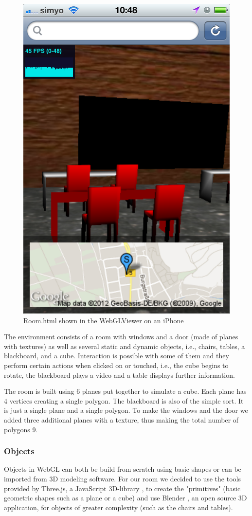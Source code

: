 \documentclass[12pt,journal,compsoc]{IEEEtran}
\begin{document}
\begin{figure}[htb]
	\centerline{\includegraphics[width=0.6\columnwidth]{grafiken/room_Mobile}}
	\caption{Room.html shown in the WebGLViewer on an iPhone}
	\label{fig:roomMobile}
\end{figure}

The environment consists of a room with windows and a door (made of planes with textures) as well as several static and dynamic objects, i.e., chairs, tables, a blackboard, and a cube. Interaction is possible with some of them and they perform certain actions when clicked on or touched, i.e., the cube begins to rotate, the blackboard plays a video and a table displays further information.

The room is built using 6 planes put together to simulate a cube. Each plane has 4 vertices creating a single polygon. The blackboard is also of the simple sort. It is just a single plane and a single polygon. To make the windows and the door we added three additional planes with a texture, thus making the total number of polygons 9.

\subsubsection{Objects}
Objects in WebGL can both be build from scratch using basic shapes or can be imported from 3D modeling software. For our room we decided to use the tools provided by Three.js, a JavaScript 3D-library \cite{ThreeJS}, to create the "primitives" (basic geometric shapes such as a plane or a cube) and use Blender \cite{Blender3d}, an open source 3D application, for objects of greater complexity (such as the chairs and tables).
\end{document}

